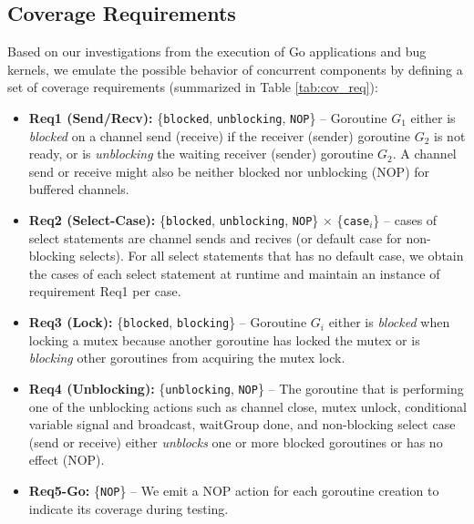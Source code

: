 \subsection{Coverage Requirements}
\label{sec:ch4_covreq}
Based on our investigations from the execution of Go applications and bug kernels, we emulate the possible behavior of concurrent components by defining a set of coverage requirements (summarized in Table \ref{tab:cov_req}):
%
\begin{itemize}
  \item \textbf{Req1 (Send/Recv):} \{\texttt{blocked}, \texttt{unblocking}, \texttt{NOP}\} -- Goroutine $G_1$ either is \textit{blocked} on a channel send (receive) if the receiver (sender) goroutine $G_2$ is not ready, or is \textit{unblocking} the waiting receiver (sender) goroutine $G_2$. A channel send or receive might also be neither blocked nor unblocking (NOP) for buffered channels.
  \item \textbf{Req2 (Select-Case):} \{\texttt{blocked}, \texttt{unblocking}, \texttt{NOP}\} $\times$ \{\texttt{case}$_i$\} -- cases of select statements are channel sends and recives (or default case for non-blocking selects). For all select statements that has no default case, we obtain the cases of each select statement at runtime and maintain an instance of requirement Req1 per case.
  \item \textbf{Req3 (Lock):} \{\texttt{blocked}, \texttt{blocking}\} -- Goroutine $G_i$ either is \textit{blocked} when locking a mutex because another goroutine has locked the mutex or is \textit{blocking} other goroutines from acquiring the mutex lock.
  \item \textbf{Req4 (Unblocking):} \{\texttt{unblocking}, \texttt{NOP}\} -- The goroutine that is performing one of the unblocking actions such as channel close, mutex unlock, conditional variable signal and broadcast, waitGroup done, and non-blocking select case (send or receive) either \textit{unblocks} one or more blocked goroutines or has no effect (NOP).
  \item \textbf{Req5-Go:} \{\texttt{NOP}\} -- We emit a NOP action for each goroutine creation to indicate its coverage during testing.
\end{itemize}



